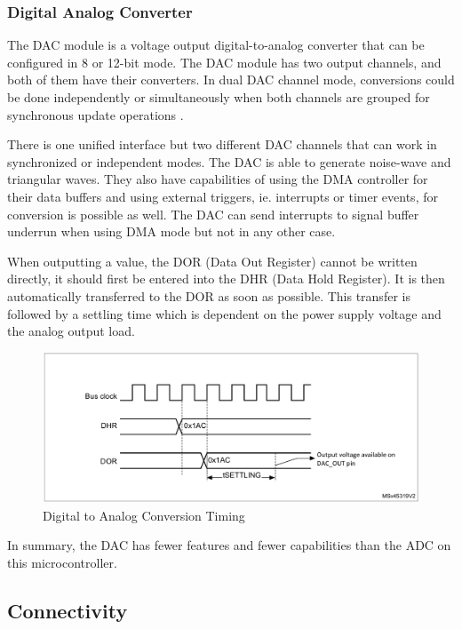 \subsubsection{Digital Analog Converter}

The DAC module is a voltage output digital-to-analog converter that can be configured in 8 or 12-bit mode. The DAC module has two output channels, and both of them have their converters. In dual DAC channel mode, conversions could be done independently or simultaneously when both channels are grouped for synchronous update operations \cite{DACDescription}.

There is one unified interface but two different DAC channels that can work in synchronized or independent modes. The DAC is able to generate noise-wave and triangular waves. They also have capabilities of using the DMA controller for their data buffers and using external triggers, ie. interrupts or timer events, for conversion is possible as well. The DAC can send interrupts to signal buffer underrun when using DMA mode but not in any other case.

When outputting a value, the DOR (Data Out Register) cannot be written directly, it should first be entered into the DHR (Data Hold Register). It is then automatically transferred to the DOR as soon as possible. This transfer is followed by a settling time which is dependent on the power supply voltage and the analog output load.

\begin{figure}[!ht]
    \centering
    \includegraphics[width=150mm, keepaspectratio]{figures/dac-timing.png}
    \caption{Digital to Analog Conversion Timing\cite{DACTime}}
    \label{fig:dac-timing}
\end{figure}

In summary, the DAC has fewer features and fewer capabilities than the ADC on this microcontroller.

\subsection{Connectivity}

